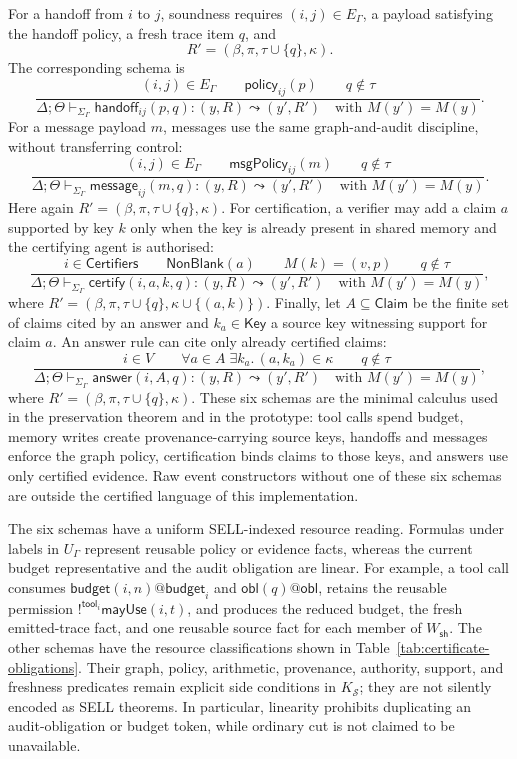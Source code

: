 \documentclass[a4paper,fleqn]{cas-sc}
\newcommand{\Claim}{\mathsf{Claim}}
\newcommand{\Key}{\mathsf{Key}}
\begin{document}
For a handoff from \(i\) to \(j\), soundness requires \((i,j)\in E_{\Gamma}\), a payload satisfying the handoff policy, a fresh trace item \(q\), and
\[
  R'=(\beta,\pi,\tau\cup\{q\},\kappa).
\]
The corresponding schema is
\[
\frac{
  (i,j)\in E_{\Gamma}
  \qquad
  \mathsf{policy}_{ij}(p)
  \qquad
  q\notin\tau
}{
  \Delta;\Theta\vdash_{\Sigma_{\Gamma}}
  \mathsf{handoff}_{ij}(p,q):(y,R)\leadsto(y',R')
  \quad\text{with }M(y')=M(y)
}.
\]
For a message payload \(m\), messages use the same graph-and-audit discipline,
without transferring control:
\[
\frac{
  (i,j)\in E_{\Gamma}
  \qquad
  \mathsf{msgPolicy}_{ij}(m)
  \qquad
  q\notin\tau
}{
  \Delta;\Theta\vdash_{\Sigma_{\Gamma}}
  \mathsf{message}_{ij}(m,q):(y,R)\leadsto(y',R')
  \quad\text{with }M(y')=M(y)
}.
\]
Here again \(R'=(\beta,\pi,\tau\cup\{q\},\kappa)\). For certification, a verifier may add a claim \(a\) supported by key \(k\) only when the key is already present in shared memory and the certifying agent is authorised:
\[
\frac{
  i\in\mathsf{Certifiers}
  \qquad
  \mathsf{NonBlank}(a)
  \qquad
  M(k)=(v,p)
  \qquad
  q\notin\tau
}{
  \Delta;\Theta\vdash_{\Sigma_{\Gamma}}
  \mathsf{certify}(i,a,k,q):(y,R)\leadsto(y',R')
  \quad\text{with }M(y')=M(y)
},
\]
where \(R'=(\beta,\pi,\tau\cup\{q\},\kappa\cup\{(a,k)\})\). Finally, let
\(A\subseteq\Claim\) be the finite set of claims cited by an answer and
\(k_a\in\Key\) a source key witnessing support for claim \(a\). An answer
rule can cite only already certified claims:
\[
\frac{
  i\in V
  \qquad
  \forall a\in A\;\exists k_a.\,(a,k_a)\in\kappa
  \qquad
  q\notin\tau
}{
  \Delta;\Theta\vdash_{\Sigma_{\Gamma}}
  \mathsf{answer}(i,A,q):(y,R)\leadsto(y',R')
  \quad\text{with }M(y')=M(y)
},
\]
where \(R'=(\beta,\pi,\tau\cup\{q\},\kappa)\). These six schemas are the minimal calculus used in the preservation theorem and in the prototype: tool calls spend budget, memory writes create provenance-carrying source keys, handoffs and messages enforce the graph policy, certification binds claims to those keys, and answers use only certified evidence.
Raw event constructors without one of these six schemas are outside the
certified language of this implementation.

The six schemas have a uniform SELL-indexed resource reading. Formulas under
labels in \(U_{\Gamma}\) represent reusable policy or evidence facts, whereas
the current budget representative and the audit obligation are linear. For
example, a tool call consumes
\(\mathsf{budget}(i,n)@\mathsf{budget}_i\) and
\(\mathsf{obl}(q)@\mathsf{obl}\), retains the reusable permission
\(!^{\mathsf{tool}_i}\mathsf{mayUse}(i,t)\), and produces the reduced budget,
the fresh emitted-trace fact, and one reusable source fact for each member of
\(W_{\mathsf{sh}}\). The other schemas have the resource classifications shown in
Table~\ref{tab:certificate-obligations}. Their graph, policy, arithmetic,
provenance, authority, support, and freshness predicates remain explicit
side conditions in \(K_{\mathcal S}\); they are not silently encoded as SELL
theorems. In particular, linearity prohibits duplicating an audit-obligation or
budget token, while ordinary cut is not claimed to be unavailable.
\end{document}
